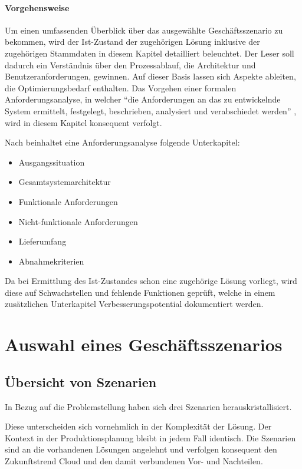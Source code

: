 \paragraph{Vorgehensweise}
Um einen umfassenden Überblick über das ausgewählte Geschäftsszenario zu bekommen, wird der Ist-Zustand der zugehörigen Lösung inklusive der zugehörigen Stammdaten in diesem Kapitel detailliert beleuchtet. Der Leser soll dadurch ein Verständnis über den Prozessablauf, die Architektur und Benutzeranforderungen, gewinnen. Auf dieser Basis lassen sich Aspekte ableiten, die Optimierungsbedarf enthalten. Das Vorgehen einer formalen Anforderungsanalyse, in welcher \enquote{die Anforderungen an das zu entwickelnde System ermittelt, festgelegt, beschrieben, analysiert und verabschiedet werden}
\autocite{Partsch.2010}
, wird in diesem Kapitel konsequent verfolgt.

Nach \citeauthor{Balzert.2011} beinhaltet eine Anforderungsanalyse folgende Unterkapitel:
\begin{itemize}
	\item Ausgangssituation
	\item Gesamtsystemarchitektur
	\item Funktionale Anforderungen
	\item Nicht-funktionale Anforderungen
	\item Lieferumfang
	\item Abnahmekriterien
	      \autocite{Balzert.2011}
\end{itemize}

Da bei Ermittlung des Ist-Zustandes schon eine zugehörige Lösung vorliegt, wird diese auf Schwachstellen und fehlende Funktionen geprüft, welche in einem zusätzlichen Unterkapitel Verbesserungspotential dokumentiert werden. 
% 
% 
% 
% 
% 
% 
\section{Auswahl eines Geschäftsszenarios}

\subsection{Übersicht von Szenarien}
In Bezug auf die Problemstellung haben sich drei Szenarien herauskristallisiert. 

Diese unterscheiden sich vornehmlich in der Komplexität der Lösung. Der Kontext in der Produktionsplanung bleibt in jedem Fall identisch. Die Szenarien sind an die vorhandenen Lösungen angelehnt und verfolgen konsequent den Zukunftstrend Cloud und den damit verbundenen Vor- und Nachteilen.

